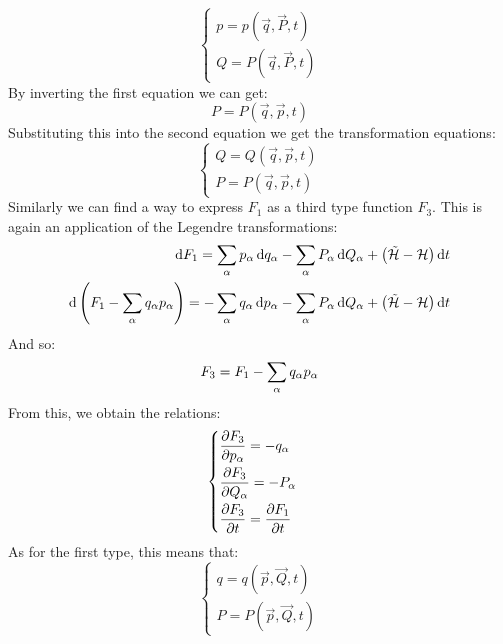 \begin{equation}
    \begin{cases}
        p = p(\vec{q},\vec{P},t)\\[8pt]
        Q = P(\vec{q},\vec{P},t)
    \end{cases}
\end{equation}
By inverting the first equation we can get:
\begin{equation}
    P = P(\vec{q},\vec{p},t)
\end{equation}
Substituting this into the second equation we get the transformation equations:
\begin{equation}
    \begin{cases}
        Q = Q(\vec{q},\vec{p},t)\\[8pt]
        P = P(\vec{q},\vec{p},t)
    \end{cases}
\end{equation}
Similarly we can find a way to express $F_1$ as a third type function $F_3$. This is again an application of the Legendre transformations:
\begin{equation}
    \begin{split}
        \dd{F_1} = \displaystyle\sum_{\alpha}p_{\alpha}\dd{q_{\alpha}} - \displaystyle\sum_{\alpha}P_{\alpha}\dd{Q_{\alpha}} + \left(\tilde{\mathcal{H}}- \mathcal{H}\right)\dd{t}\\
    \dd{\left(F_1 - \displaystyle\sum_{\alpha}q_{\alpha}p_{\alpha}\right)} = -\displaystyle\sum_{\alpha}q_{\alpha}\dd{p_{\alpha}} - \displaystyle\sum_{\alpha}P_{\alpha}\dd{Q_{\alpha}} + \left(\tilde{\mathcal{H}}- \mathcal{H}\right)\dd{t}
    \end{split}
\end{equation}
And so:
\begin{equation}
    F_3 = F_1 - \displaystyle\sum_{\alpha}q_{\alpha}p_{\alpha}
\end{equation}
From this, we obtain the relations:
\begin{equation}
    \begin{cases}
        \pdv{F_3}{p_{\alpha}} = -q_{\alpha}\\[8pt]
        \pdv{F_3}{Q_{\alpha}} = -P_{\alpha}\\[8pt]
        \pdv{F_3}{t} = \pdv{F_1}{t}
    \end{cases}
\end{equation}
As for the first type, this means that:
\begin{equation}
    \begin{cases}
        q = q(\vec{p},\vec{Q},t)\\[8pt]
        P = P(\vec{p},\vec{Q},t)
    \end{cases}
\end{equation}

